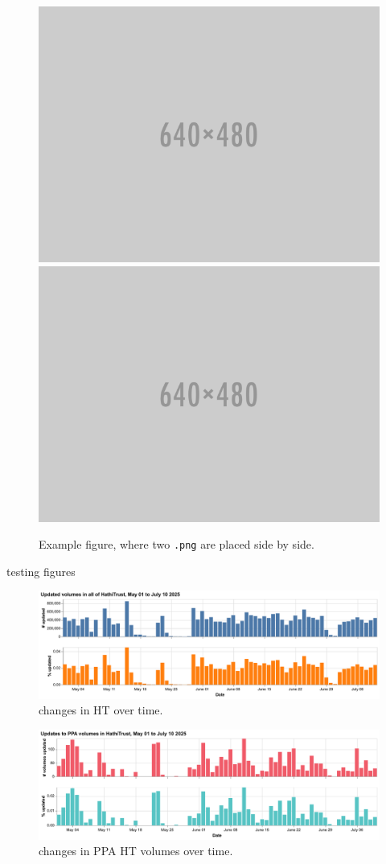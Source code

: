 \documentclass{anthology-ch}         %
\begin{document}
\begin{figure}[t!]
  \centering
  \includegraphics[width=0.4\linewidth]{640x480.png}
  \includegraphics[width=0.4\linewidth]{640x480.png}
  \caption{Example figure, where two \texttt{.png} are placed side by side.}
  \label{fig:example_bigger}
\end{figure}


testing figures


\begin{figure}[t!]
  \centering
  \includegraphics[width=\linewidth]{figures/hathitrust_changes.pdf}
  \caption{changes in HT over time.}
  \label{fig:ht_updates}
\end{figure}


\begin{figure}[t!]
  \centering
  \includegraphics[width=\linewidth]{figures/ppa_hathitrust_changes.pdf}
  \caption{changes in PPA HT volumes over time.}
  \label{fig:ppa_ht_updates}
\end{figure}
\end{document}

